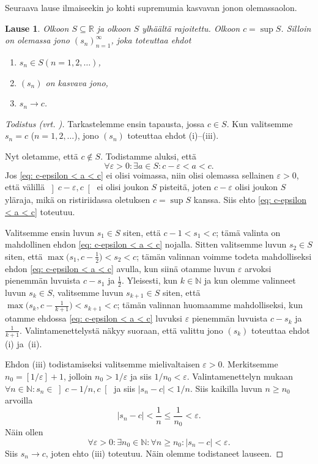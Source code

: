 \documentclass[a4paper,12pt,leqno,oneside]{report} %
\theoremstyle{plain}
\newtheorem{lause}{Lause}[chapter]
\theoremstyle{definition}
\theoremstyle{remark}
\numberwithin{equation}{chapter}
\newcommand*{\Nset}{\mathbb{N}}  %
\newcommand*{\Rset}{\mathbb{R}}  %
\newcommand*{\abs}[1]{\left\lvert#1\right\rvert}   %
\begin{document}
Seuraava lause ilmaiseekin jo kohti supremumia kasvavan jonon olemassaolon.

\begin{lause}\label{thm: kohti supremumia kasvava jono}
Olkoon $S\subseteq\Rset$ ja olkoon $S$ ylhäältä rajoitettu. Olkoon $c = \sup S$. Silloin on olemassa jono $(s_n)_{n=1}^\infty$, joka toteuttaa ehdot
\begin{enumerate}[\upshape(i)]
    \item $s_n\in S$\quad $(n = 1,2,\dots)$,
    \item $(s_n)$ on kasvava jono,
    \item $s_n\to c$.
\end{enumerate}
\end{lause}

\begin{proof}[Todistus \upshape(vrt. {\cite[s. 66]{Mathman}})]
Tarkastelemme ensin tapausta, jossa $c\in S$. Kun valitsemme $s_n = c$ ($n = 1,2,\dots$), jono $(s_n)$ toteuttaa ehdot (i)--(iii).

Nyt oletamme, että $c\notin S$. Todistamme aluksi, että 
\begin{equation}\label{eq: c-epsilon < a < c}
    \forall\varepsilon > 0\colon \exists a\in S\colon c - \varepsilon < a < c.
\end{equation}
Jos \eqref{eq: c-epsilon < a < c} ei olisi voimassa, niin olisi olemassa sellainen $\varepsilon > 0$, että välillä $\left]c-\varepsilon,c\right[$ ei olisi joukon $S$ pisteitä, joten $c - \varepsilon$ olisi joukon $S$ yläraja, mikä on ristiriidassa oletuksen $c = \sup S$ kanssa. Siis ehto \eqref{eq: c-epsilon < a < c} toteutuu.

Valitsemme ensin luvun $s_1\in S$ siten, että $c-1 < s_1 < c$; tämä valinta on mahdollinen ehdon \eqref{eq: c-epsilon < a < c} nojalla. Sitten valitsemme luvun $s_2\in S$ siten, että $\max\bigl(s_1,c-\frac{1}{2}\bigr) < s_2 < c$; tämän valinnan voimme todeta mahdolliseksi ehdon \eqref{eq: c-epsilon < a < c} avulla, kun siinä otamme luvun $\varepsilon$ arvoksi pienemmän luvuista $c-s_1$ ja $\frac{1}{2}$. Yleisesti, kun $k\in\Nset$ ja kun olemme valinneet luvun $s_k\in S$, valitsemme luvun $s_{k+1}\in S$ siten, että $\max\bigl(s_k,c-\frac{1}{k+1}\bigr) < s_{k+1} < c$; tämän valinnan huomaamme mahdolliseksi, kun otamme ehdossa \eqref{eq: c-epsilon < a < c} luvuksi $\varepsilon$ pienemmän luvuista $c-s_k$ ja $\frac{1}{k+1}$. Valintamenettelystä näkyy suoraan, että valittu jono $(s_k)$ toteuttaa ehdot (i) ja~(ii).

Ehdon (iii) todistamiseksi valitsemme mielivaltaisen $\varepsilon > 0$. Merkitsemme $n_0 = [1/\varepsilon] + 1$, jolloin $n_0 > 1/\varepsilon$ ja siis $1/n_0 < \varepsilon$. Valintamenettelyn mukaan $\forall n\in\Nset\colon s_n\in\left]c-1/n,c\right[$ ja siis $\abs{s_n - c} < 1/n$. Siis kaikilla luvun $n\ge n_0$ arvoilla
\[
    \abs{s_n - c} < \frac{1}{n} \le \frac{1}{n_0} < \varepsilon.
\]
Näin ollen
\[
    \forall \varepsilon > 0\colon \exists n_0\in\Nset\colon
    \forall n\ge n_0\colon \abs{s_n - c} < \varepsilon.
\]
Siis $s_n\to c$, joten ehto (iii) toteutuu. Näin olemme todistaneet lauseen.
\end{proof}
\end{document}
